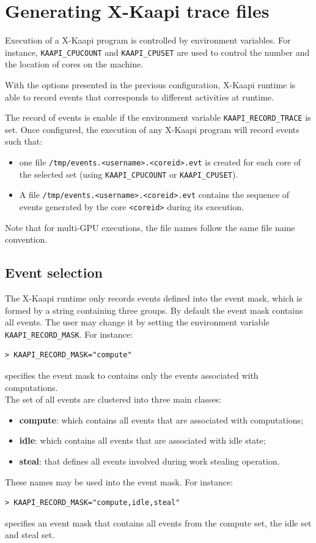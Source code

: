 \documentclass{article}[12pt]
\newcommand{\kaapi}{\textsc{X}-Kaapi\xspace}
\begin{document}
\section{Generating \kaapi trace files} \label{sec:generate}

Execution of a \kaapi program is controlled by environment variables.
For instance, \verb+KAAPI_CPUCOUNT+ and \verb+KAAPI_CPUSET+ are used
to control the number and the location of cores on the machine.

With the options presented in the previous configuration, \kaapi runtime is able to record events that corresponds to different activities at runtime. 

The record of events is enable if the environment variable \verb+KAAPI_RECORD_TRACE+ is set.
Once configured, the execution of any \kaapi program will record events such that:
\begin{itemize} 
\item one file \verb+/tmp/events.<username>.<coreid>.evt+ is created for each core of the  selected set (using \verb+KAAPI_CPUCOUNT+ or \verb+KAAPI_CPUSET+). 
\item A file \verb+/tmp/events.<username>.<coreid>.evt+ contains the sequence of events generated by the core \verb+<coreid>+ during its execution. 
\end{itemize} 

Note that for multi-GPU executions, the file names follow the same file name convention.

\subsection{Event selection}

The \kaapi runtime only records events defined into the event mask, which is
formed by a string containing three groups.
By default the event mask contains all events. The user may change it  by setting the environment variable \verb+KAAPI_RECORD_MASK+. For instance:
\begin{verbatim}
> KAAPI_RECORD_MASK="compute"
\end{verbatim}
specifies the event mask to contains only the events associated with computations.\\

The set of all events are clustered into three main classes:
\begin{itemize}
\item \textbf{compute}: which contains all  events that are associated with computations;
\item \textbf{idle}: which contains all events that are associated with idle state;
\item \textbf{steal}: that defines all events involved during work stealing operation.
\end{itemize}
These names may be used into the event mask. For instance:
\begin{verbatim}
> KAAPI_RECORD_MASK="compute,idle,steal"
\end{verbatim}
specifies an event mask that contains all events from the compute set, the idle set and steal set.
\end{document}

